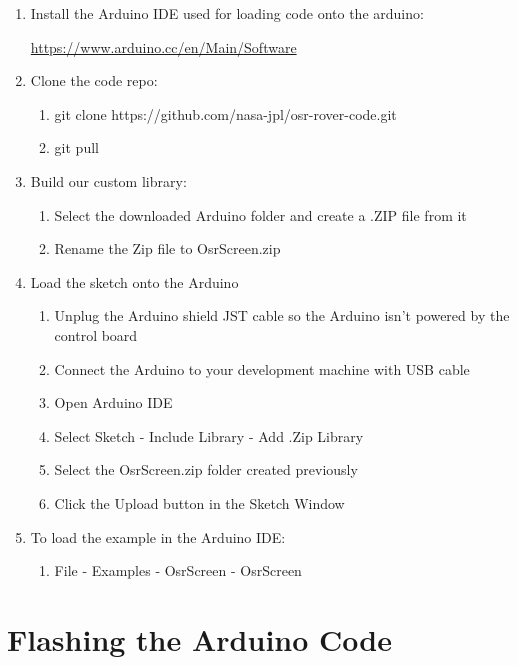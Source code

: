 \documentclass{article}
\begin{document}
\begin{enumerate} 
\item Install the Arduino IDE used for loading code onto the arduino:

	\href{https://www.arduino.cc/en/Main/Software}{https://www.arduino.cc/en/Main/Software}

\item Clone the code repo:
	\begin{enumerate}
	\item git clone https://github.com/nasa-jpl/osr-rover-code.git
	\item git pull
	\end{enumerate}

\item Build our custom library:
	\begin{enumerate}
	\item Select the downloaded Arduino folder and create a .ZIP file from it
	\item Rename the Zip file to OsrScreen.zip
	\end{enumerate}

\item Load the sketch onto the Arduino
	\begin{enumerate}
	\item Unplug the Arduino shield JST cable so the Arduino isn't powered by the control board
	\item Connect the Arduino to your development machine with USB cable
	\item Open Arduino IDE
	\item Select Sketch - Include Library - Add .Zip Library 
	\item Select the OsrScreen.zip folder created previously
	\item Click the Upload button in the Sketch Window	
	\end{enumerate}

\item To load the example in the Arduino IDE: 
	\begin{enumerate}
	\item File - Examples - OsrScreen - OsrScreen 
	\end{enumerate}

\end{enumerate}

\section{Flashing the Arduino Code}
\end{document}
